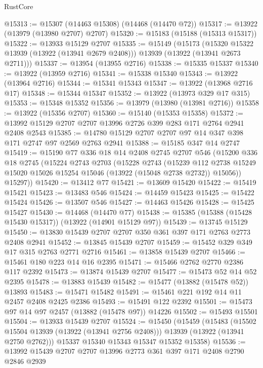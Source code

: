 \begin{lexlean}{RustCore}
\begin{coremodule}
@15313 := @15307 (@14463 @15308) (@14468 (@14470 @72))
@15317 := @13922 (@13979 (@13980 @2707) @2707)
@15320 := @15183 (@15188 (@15313 @15317))
@15322 := @13933 @15129 @2707
@15335 := @15149
    (@15173
      (@15320 @15322 @13939 (@13922 (@13941 @2679 @2408)))
      @13939
      (@13922 (@13941 @2673 @2711)))
@15337 := @13954 (@13955 @2716)
@15338 := @15335 @15337
@15340 := @13922 (@13959 @2716)
@15341 := @15338 @15340
@15343 := @13922 (@13964 @2716)
@15344 := @15341 @15343
@15347 := @13922 (@13968 @2716 @17)
@15348 := @15344 @15347
@15352 := @13922 (@13973 @329 @17 @315)
@15353 := @15348 @15352
@15356 := @13979 (@13980 (@13981 @2716))
@15358 := @13922 (@15356 @2707)
@15360 := @15140 (@15353 @15358)
@15372 := @13992 @15129 @2707 @2707 @13996 @2726 @399 @283 @171 @2764 @2941 @2408 @2543
@15385 := @14780 @15129 @2707 @2707 @97 @14 @347 @398 @171 @2747 @97 @2569 @2763 @2941
@15388 := @15185 @347 @14 @2747
@15419 := @15190
    @77
    @336
    @18
    @14
    @2408
    @2745
    @2707
    @546
    (@15200
      @336
      @18
      @2745
      (@15224
        @2743
        @2703
        (@15228
          @2743
          (@15239
            @112
            @2738
            @15249
            @15020
            @15026
            @15254
            @15046
            (@13922 (@15048 @2738 @2732))
            @15056))
        @15297))
@15420 := @13412 @77
@15421 := @13609 @15420
@15422 := @15419 @15421
@15423 := @13483 @546
@15424 := @14459 @15423
@15425 := @15422 @15424
@15426 := @13507 @546
@15427 := @14463 @15426
@15428 := @15425 @15427
@15430 := @14468 (@14470 @77)
@15438 := @15385 (@15388 (@15428 @15430 @15317)) (@13922 (@14901 @15129 @97))
@15439 := @13745 @15129
@15450 := @13830 @15439 @2707 @2707 @350 @361 @397 @171 @2763 @2773 @2408 @2941
@15452 := @13845 @15439 @2707
@15459 := @15452 @329 @349 @17 @315 @2763 @2771 @2716
@15461 := @13858 @15439 @2707
@15466 := @15461 @180 @223 @14 @16 @2395
@15471 := @15466 @2762 @2770 @2386 @117 @2392
@15473 := @13874 @15439 @2707
@15477 := @15473 @52 @14 @52 @2395
@15478 := @13883 @15439
@15482 := @15477 (@13882 (@15478 @52)) @13893
@15483 := @15471 @15482
@15491 := @15461 @221 @192 @14 @11 @2457 @2408 @2425 @2386
@15493 := @15491 @122 @2392
@15501 := @15473 @97 @14 @97 @2457 (@13882 (@15478 @97)) @14226
@15502 := @15493 @15501
@15504 := @13933 @15439 @2707
@15524 := @15450
    (@15459
      (@15483
        (@15502 @15504 @13939 (@13922 (@13941 @2756 @2408)))
        @13939
        (@13922 (@13941 @2750 @2762)))
      @15337
      @15340
      @15343
      @15347
      @15352
      @15358)
@15536 := @13992 @15439 @2707 @2707 @13996 @2773 @361 @397 @171 @2408 @2790 @2846 @2939

\end{coremodule}
\end{lexlean}
